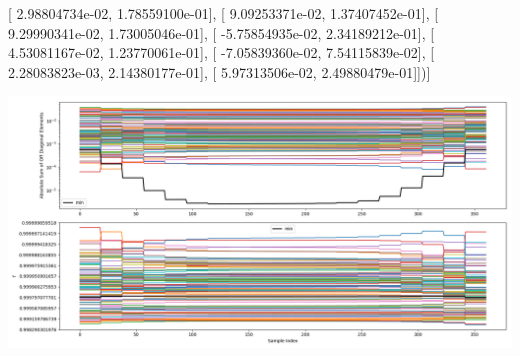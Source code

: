 \documentclass{article}
\begin{document}
       [  2.98804734e-02,   1.78559100e-01],
       [  9.09253371e-02,   1.37407452e-01],
       [  9.29990341e-02,   1.73005046e-01],
       [ -5.75854935e-02,   2.34189212e-01],
       [  4.53081167e-02,   1.23770061e-01],
       [ -7.05839360e-02,   7.54115839e-02],
       [  2.28083823e-03,   2.14380177e-01],
       [  5.97313506e-02,   2.49880479e-01]])]
\begin{center}
\includegraphics[scale=.9]{report_pickled_controls246/control_dpn_all.png}

\end{center}
\end{document}

